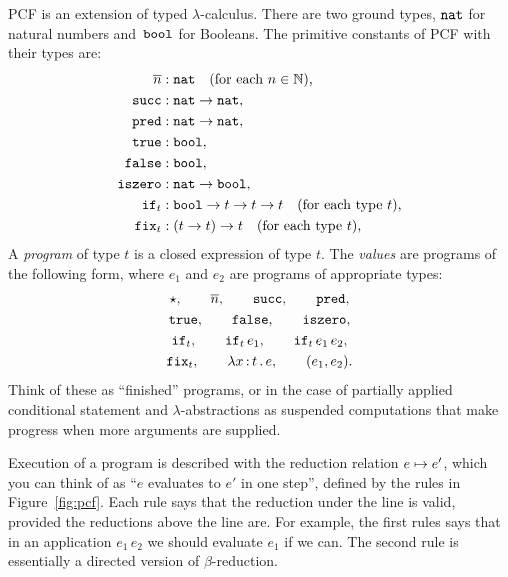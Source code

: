 PCF is an extension of typed $\lambda$-calculus. There are two ground
types, $\mathtt{nat}$ for natural numbers and~$\mathtt{bool}$ for Booleans. The
primitive constants of PCF with their types are:
%
\begin{align*}
  \overline{n} &: \mathtt{nat} \quad \text{(for each $n \in \mathbb{N}$),} \\
  \mathtt{succ} &: \mathtt{nat} \to \mathtt{nat}, \\
  \mathtt{pred} &: \mathtt{nat} \to \mathtt{nat}, \\
  \mathtt{true} &: \mathtt{bool}, \\
  \mathtt{false} &: \mathtt{bool}, \\
  \mathtt{iszero} &: \mathtt{nat} \to \mathtt{bool}, \\
  \mathtt{if}_t &: \mathtt{bool} \to t \to t \to t \quad\text{(for each type $t$),}\\
  \mathtt{fix}_t &: (t \to t) \to t \quad\text{(for each type $t$),}
\end{align*}
%
A \emph{program} of type $t$ is a closed expression of type $t$. The
\emph{values} are programs of the following form, where $e_1$ and
$e_2$ are programs of appropriate types:
%
\begin{gather*}
  \star,\qquad \overline{n},\qquad \mathtt{succ},\qquad \mathtt{pred},\\
  \mathtt{true},\qquad \mathtt{false},\qquad \mathtt{iszero},\\
  \mathtt{if}_t,\qquad \mathtt{if}_t \, e_1,\qquad \mathtt{if}_t \, e_1\, e_2,\\
  \mathtt{fix}_t,\qquad \lambda x \,{:}\, t\,.\,e,\qquad (e_1, e_2).
\end{gather*}
%
Think of these as ``finished'' programs, or in the case of partially
applied conditional statement and $\lambda$-abstractions as suspended
computations that make progress when more arguments are supplied.

Execution of a program is described with the reduction relation $e
\mapsto e'$, which you can think of as ``$e$ evaluates to $e'$ in one
step'', defined by the rules in Figure~\ref{fig:pcf}. Each rule says
that the reduction under the line is valid, provided the reductions
above the line are. For example, the first rules says that in an
application $e_1\,e_2$ we should evaluate $e_1$ if we can. The second
rule is essentially a directed version of $\beta$-reduction.

